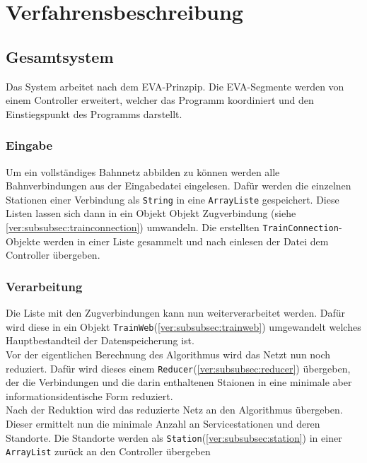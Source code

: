 \chapter{Verfahrensbeschreibung}\label{ch:verfahrensbeschreibung}


\section{Gesamtsystem}\label{ver:sec:gesamtsystem}
Das System arbeitet nach dem EVA-Prinzpip. Die EVA-Segmente werden von einem Controller erweitert, welcher das Programm koordiniert und den Einstiegspunkt des Programms darstellt.

\subsection{Eingabe}\label{ver:subsec:eingabe}
Um ein vollständiges Bahnnetz abbilden zu können werden alle Bahnverbindungen aus der Eingabedatei eingelesen. Dafür werden die einzelnen Stationen einer Verbindung als \texttt{String} in eine \texttt{ArrayListe} gespeichert. Diese Listen lassen sich dann in ein Objekt Objekt Zugverbindung (siehe \ref{ver:subsubsec:trainconnection}) umwandeln. Die erstellten \texttt{TrainConnection}-Objekte werden in einer Liste gesammelt und nach einlesen der Datei dem Controller übergeben.\\

\subsection{Verarbeitung}\label{subsec:verarbeitung}
Die Liste mit den Zugverbindungen kann nun weiterverarbeitet werden. Dafür wird diese in ein Objekt \texttt{TrainWeb}(\ref{ver:subsubsec:trainweb}) umgewandelt welches Hauptbestandteil der Datenspeicherung ist.\\
Vor der eigentlichen Berechnung des Algorithmus wird das Netzt nun noch reduziert. Dafür wird dieses einem \texttt{Reducer}(\ref{ver:subsubsec:reducer}) übergeben, der die Verbindungen und die darin enthaltenen Staionen in eine minimale aber informationsidentische Form reduziert. \\
Nach der Reduktion wird das reduzierte Netz an den Algorithmus übergeben. Dieser ermittelt nun die minimale Anzahl an Servicestationen und deren Standorte. Die Standorte werden als \texttt{Station}(\ref{ver:subsubsec:station}) in einer \texttt{ArrayList} zurück an den Controller übergeben\\

